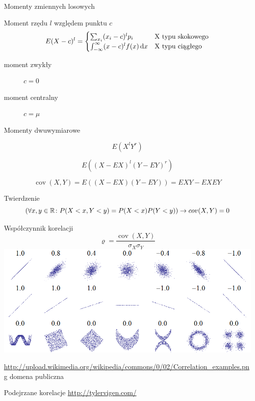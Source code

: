 \documentclass{mp}
\subtitle{Momenty wielowymiarowe}
\DeclareMathOperator{\cov}{cov}
\begin{document}
\frame{\titlepage}
\begin{frame}{Momenty zmiennych losowych}
\begin{block}{Moment rzędu $l$ względem punktu $c$}
\[ E(X-c)^l=\begin{cases} \sum_{x_i} (x_i-c)^lp_i & $X$\text{ typu skokowego} \\
\int_{-\infty}^\infty (x-c)^lf(x)\d{x} & $X$\text{ typu ciągłego}
\end{cases} \]
\end{block}
\begin{description}
\item[moment zwykły] $c=0$
\item[moment centralny] $c=\mu$
\end{description}
\end{frame}
\begin{frame}{Momenty dwuwymiarowe}
\begin{description}
\item<+->[moment zwykły rzędu $l+r$] \[E(X^lY^r)\]
\item<+->[moment centralny rzędu $l+r$] \[E((X-EX)^l(Y-EY)^r)\]
\item<+->[kowariancja] \[\cov(X,Y)=E((X-EX)(Y-EY))=EXY-EXEY\]
\end{description}
\only<+->
{
\begin{block}{Twierdzenie}
\[\left(\forall x,y\in\mathbb{R}\colon P(X<x,Y<y)=P(X<x)P(Y<y) \right) \to cov(X,Y)=0 \]
\end{block}
}
\end{frame}
\begin{frame}{Współczynnik korelacji}
\[\varrho=\frac{\cov(X,Y)}{\sigma_X\sigma_Y} \]
\includegraphics[width=\textwidth]{10_korelacja/Correlation_examples.png}

{\tiny \url{http://upload.wikimedia.org/wikipedia/commons/0/02/Correlation_examples.png} domena publiczna}
\end{frame}
\begin{frame}{Podejrzane korelacje}
\url{http://tylervigen.com/}
\end{frame}

\end{document}
